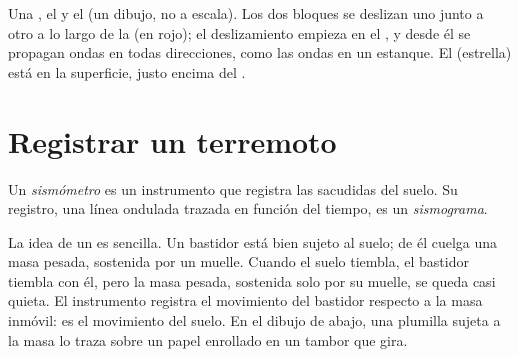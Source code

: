 \begin{omfigure}
{\small Una , el  y el  (un dibujo, no a escala).
Los dos bloques se deslizan uno junto a otro a lo largo de la  (en
rojo); el deslizamiento empieza en el , y desde él se propagan
ondas en todas direcciones, como las ondas en un estanque. El 
(estrella) está en la superficie, justo encima del .}
\label{fig:g7:earthquakes:fault}
\end{omfigure}


\section{Registrar un terremoto}

\begin{definition}\label{def:g7:earthquakes:seismometer}
Un \emph{sismómetro} es un instrumento que
registra las sacudidas del suelo. Su registro, una línea ondulada trazada
en función del tiempo, es un \emph{sismograma}.
\end{definition}

La idea de un  es sencilla. Un bastidor está bien sujeto al
suelo; de él cuelga una masa pesada, sostenida por un muelle. Cuando el
suelo tiembla, el bastidor tiembla con él, pero la masa pesada, sostenida
solo por su muelle, se queda casi quieta. El instrumento registra el
movimiento del bastidor respecto a la masa inmóvil: es el movimiento del
suelo. En el dibujo de abajo, una plumilla sujeta a la masa lo traza sobre
un papel enrollado en un tambor que gira.

